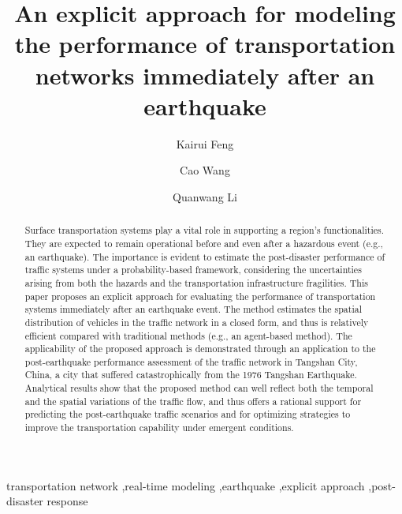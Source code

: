 \documentclass[review,11pt,nonatbib]{elsarticle}
\begin{document}
\begin{frontmatter}

\title{An explicit approach for modeling the performance of transportation networks immediately after an earthquake}
\author[add1,add2]{Kairui Feng}
\author[add3]{Cao Wang}
\author[add1]{Quanwang Li}

\address[add1]{Department of Civil Engineering, Tsinghua University, Beijing 100084, China}
\address[add2]{Department of Civil and Environmental Engineering, Princeton University, Princeton, NJ 08540, USA}
\address[add3]{School of Civil, Mining and Environmental Engineering, University of Wollongong, Wollongong, NSW 2522, Australia}

\begin{abstract}
  Surface transportation systems play a vital role in supporting a region's functionalities. They are expected to remain operational before and even after a hazardous event (e.g., an earthquake). The importance is evident to estimate the post-disaster performance of traffic systems under a probability-based framework, considering the uncertainties arising from both the hazards and the transportation infrastructure fragilities. This paper proposes an explicit approach for evaluating the performance of transportation systems immediately after an earthquake event. The method estimates the spatial distribution of vehicles in the traffic network in a closed form, and thus is relatively efficient compared with traditional methods (e.g., an agent-based method). The applicability of the proposed approach is demonstrated through an application to the post-earthquake performance assessment of the traffic network in Tangshan City, China, a city that suffered catastrophically from the 1976 Tangshan Earthquake. Analytical results show that the proposed method can well reflect both the temporal and the spatial variations of the traffic flow, and thus offers a rational support for predicting the post-earthquake traffic scenarios and for optimizing strategies to improve the transportation capability under emergent conditions.
\end{abstract}

\begin{keyword}
transportation network \sep real-time modeling \sep earthquake \sep explicit approach \sep post-disaster response
\end{keyword}

\end{frontmatter}
\end{document}
